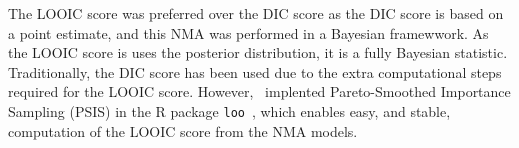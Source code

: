 The LOOIC score was preferred over the DIC score as the DIC score is based on a point estimate, and this NMA was performed in a Bayesian framewwork. As the LOOIC score is uses the posterior distribution, it is a fully Bayesian statistic. Traditionally, the DIC score has been used due to the extra computational steps required for the LOOIC score. However,~\cite{vehtari} implented Pareto-Smoothed Importance Sampling (PSIS) in the R package \verb|loo|~\cite{loo}, which enables easy, and stable, computation of the LOOIC score from the NMA models. 
